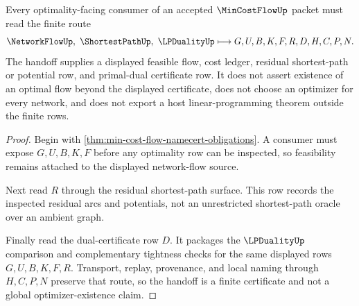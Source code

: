 \begin{theorem}
\label{thm:min-cost-flow-lp-duality-handoff}
Every optimality-facing consumer of an accepted $\MinCostFlowUp$ packet must read the finite route
$$
\NetworkFlowUp,\ \ShortestPathUp,\ \LPDualityUp
\longmapsto
G,U,B,K,F,R,D,H,C,P,N .
$$
The handoff supplies a displayed feasible flow, cost ledger, residual shortest-path or potential row, and primal-dual certificate row. It does not assert existence of an optimal flow beyond the displayed certificate, does not choose an optimizer for every network, and does not export a host linear-programming theorem outside the finite rows.
\end{theorem}
\begin{proof}
Begin with \autoref{thm:min-cost-flow-namecert-obligations}. A consumer must expose $G,U,B,K,F$ before any optimality row can be inspected, so feasibility remains attached to the displayed network-flow source.

Next read $R$ through the residual shortest-path surface. This row records the inspected residual arcs and potentials, not an unrestricted shortest-path oracle over an ambient graph.

Finally read the dual-certificate row $D$. It packages the $\LPDualityUp$ comparison and complementary tightness checks for the same displayed rows $G,U,B,K,F,R$. Transport, replay, provenance, and local naming through $H,C,P,N$ preserve that route, so the handoff is a finite certificate and not a global optimizer-existence claim.
\end{proof}




